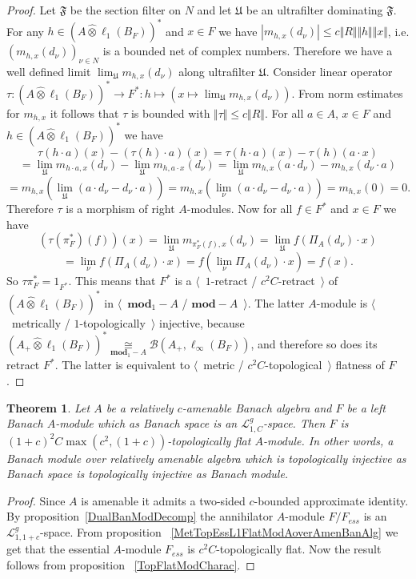 \documentclass[12pt]{article}
\newtheorem{theorem}{Theorem}[section]
\newcommand{\projtens}{\mathbin{\widehat{\otimes}}}
\newcommand{\isom}[1]{\mathop{\mathbin{\cong}}\limits_{#1}}
\begin{document}
\begin{proof}
Let $\mathfrak{F}$ be the section filter on $N$ and let $\mathfrak{U}$ be an
ultrafilter dominating $\mathfrak{F}$. For any $h\in
{(A\projtens\ell_1(B_F))}^*$ and $x\in F$ we have $|m_{h,x}(d_\nu)|\leq c\Vert
R\Vert\Vert h\Vert\Vert x\Vert$, i.e. ${(m_{h,x}(d_\nu))}_{\nu\in N}$ is a
bounded net of complex numbers. Therefore we have a well defined limit
$\lim_{\mathfrak{U}}m_{h,x}(d_\nu)$ along ultrafilter $\mathfrak{U}$. Consider
linear operator $\tau:{(A\projtens\ell_1(B_F))}^*\to
F^*:h\mapsto(x\mapsto\lim_{\mathfrak{U}}m_{h,x}(d_\nu))$. From norm estimates
for $m_{h,x}$ it follows that $\tau$ is bounded with $\Vert\tau\Vert\leq c\Vert
R\Vert$. For all $a\in A$, $x\in F$ and $h\in {(A\projtens\ell_1(B_F))}^*$ we
have
\[
\tau(h\cdot a)(x)-(\tau(h)\cdot a)(x)
=\tau(h\cdot a)(x)-\tau(h)(a\cdot x)
\]
\[
=\lim_{\mathfrak{U}}m_{h\cdot a,x}(d_\nu)
    -\lim_{\mathfrak{U}}m_{h,a\cdot x}(d_\nu)
=\lim_{\mathfrak{U}}m_{h,x}(a\cdot d_\nu)-m_{h,x}(d_\nu\cdot a)
\]
\[
=m_{h,x}\left(\lim_{\mathfrak{U}}(a\cdot d_\nu-d_\nu\cdot a)\right)
=m_{h,x}\left(\lim_{\nu}(a\cdot d_\nu-d_\nu\cdot a)\right)
=m_{h,x}(0)
=0.
\]
Therefore $\tau$ is a morphism of right $A$-modules. Now for all $f\in F^*$ and
$x\in F$ we have
\[
(\tau(\pi_F^*)(f))(x)
=\lim_{\mathfrak{U}}m_{\pi_F^*(f),x}(d_\nu)
=\lim_{\mathfrak{U}}f(\Pi_A(d_\nu)\cdot x)
\]
\[
=\lim_{\nu}f(\Pi_A(d_\nu)\cdot x)
=f\left(\lim_{\nu}\Pi_A(d_\nu)\cdot x\right)
=f(x).
\]
So $\tau\pi_F^*=1_{F^*}$. This means that $F^*$ is a $\langle$~$1$-retract /
 $c^2 C$-retract~$\rangle$ of ${(A\projtens\ell_1(B_F))}^*$ in
 $\langle$~$\mathbf{mod}_1-A$ / $\mathbf{mod}-A$~$\rangle$. The latter
 $A$-module is $\langle$~metrically / $1$-topologically~$\rangle$ injective,
 because ${(A_+\projtens\ell_1(B_F))}^* \isom{\mathbf{mod}_1-A}
 \mathcal{B}(A_+,\ell_\infty(B_F))$, and therefore so does its retract $F^*$.
 The latter is equivalent to $\langle$~metric / $c^2 C$-topological~$\rangle$
 flatness of $F$.
\end{proof}

\begin{theorem}\label{TopL1FlatModAoverAmenBanAlg} Let $A$ be a relatively
$c$-amenable Banach algebra and $F$ be a left Banach $A$-module which as Banach
space is an $\mathcal{L}_{1, C}^g$-space. Then $F$ is
${(1+c)}^2C\max(c^2,(1+c))$-topologically flat $A$-module. In other words, a
Banach module over relatively amenable algebra which is topologically injective
as Banach space is topologically injective as Banach module.
\end{theorem}
\begin{proof} Since $A$ is amenable it admits a two-sided $c$-bounded
approximate identity. By proposition~\ref{DualBanModDecomp} the annihilator
$A$-module $F/F_{ess}$ is an $\mathcal{L}_{1,1+c}^g$-space. From proposition
~\ref{MetTopEssL1FlatModAoverAmenBanAlg} we get that the essential $A$-module
$F_{ess}$ is $c^2 C$-topologically flat. Now the result follows from proposition
~\ref{TopFlatModCharac}.
\end{proof}
\end{document}

